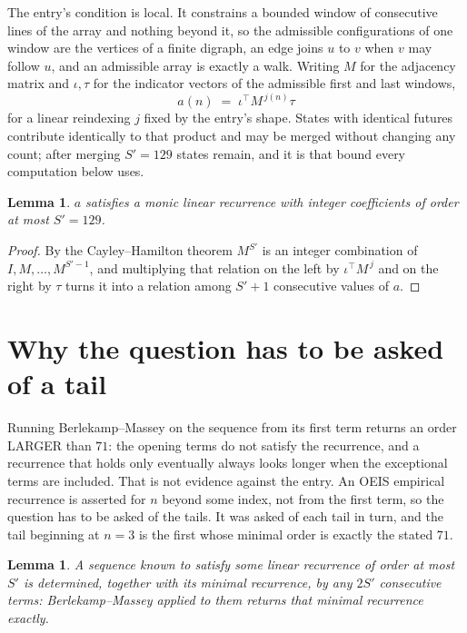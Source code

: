 \documentclass[11pt,a4paper]{article}
\theoremstyle{plain}
\newtheorem{lemma}[theorem]{Lemma}
\theoremstyle{definition}
\begin{document}
The entry's condition is local. It constrains a bounded window of consecutive lines of the
array and nothing beyond it, so the admissible configurations of one window are the vertices of
a finite digraph, an edge joins $u$ to $v$ when $v$ may follow $u$, and an admissible array is
exactly a walk. Writing $M$ for the adjacency matrix and $\iota,\tau$ for the indicator vectors
of the admissible first and last windows,
\[
a(n)\;=\;\iota^{\!\top}M^{\,j(n)}\tau
\]
for a linear reindexing $j$ fixed by the entry's shape. States with identical futures
contribute identically to that product and may be merged without changing any count; after
merging $S'=129$ states remain, and it is that bound every computation below uses.

\begin{lemma}\label{lem:cf}
$a$ satisfies a monic linear recurrence with integer coefficients of order at most $S'=129$.
\end{lemma}

\begin{proof}
By the Cayley--Hamilton theorem $M^{S'}$ is an integer combination of $I,M,\dots,M^{S'-1}$,
and multiplying that relation on the left by $\iota^{\!\top}M^{\,j}$ and on the right by
$\tau$ turns it into a relation among $S'+1$ consecutive values of $a$.
\end{proof}

\section{Why the question has to be asked of a tail}

Running Berlekamp--Massey on the sequence from its first term returns an order LARGER than $71$: the opening terms do not satisfy the recurrence, and a recurrence that holds only eventually always looks longer when the exceptional terms are included. That is not evidence against the entry. An OEIS empirical recurrence is asserted for $n$ beyond some index, not from the first term, so the question has to be asked of the tails. It was asked of each tail in turn, and the tail beginning at $n=3$ is the first whose minimal order is exactly the stated $71$.

\begin{lemma}\label{lem:bm}
A sequence known to satisfy some linear recurrence of order at most $S'$ is determined,
together with its minimal recurrence, by any $2S'$ consecutive terms: Berlekamp--Massey applied
to them returns that minimal recurrence exactly.
\end{lemma}
\end{document}
